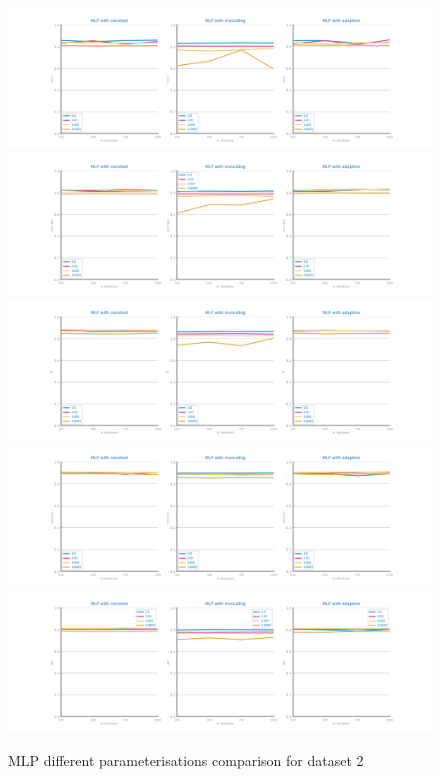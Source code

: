 \documentclass[10pt]{extarticle}
\begin{document}
\begin{figure}[H]
\centering\includegraphics[scale=0.60]{images/dataset2/models_evaluation/Credit_Score_mlp_recall_study.png}
\includegraphics[scale=0.60]{images/dataset2/models_evaluation/Credit_Score_mlp_accuracy_study.png}
\includegraphics[scale=0.60]{images/dataset2/models_evaluation/Credit_Score_mlp_f1_study.png}
\includegraphics[scale=0.60]{images/dataset2/models_evaluation/Credit_Score_mlp_precision_study.png}
\includegraphics[scale=0.60]{images/dataset2/models_evaluation/Credit_Score_mlp_auc_study.png}
\caption{MLP different parameterisations comparison for dataset 2}
\end{figure}
\end{document}
